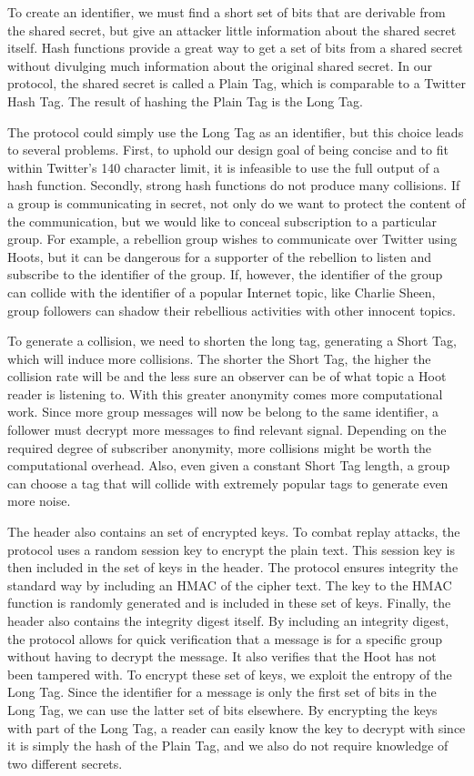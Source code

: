 \documentclass{acm_proc_article-sp}
\begin{document}
To create an identifier, we must find a short set of bits that are derivable from the shared secret, but give an attacker little information about the shared secret itself. Hash functions provide a great way to get a set of bits from a shared secret without divulging much information about the original shared secret. In our protocol, the shared secret is called a Plain Tag, which is comparable to a Twitter Hash Tag. The result of hashing the Plain Tag is the Long Tag. 

The protocol could simply use the Long Tag as an identifier, but this choice leads to several problems. First, to uphold our design goal of being concise and to fit within Twitter's 140 character limit, it is infeasible to use the full output of a hash function. Secondly, strong hash functions do not produce many collisions. If a group is communicating in secret, not only do we want to protect the content of the communication, but we would like to conceal subscription to a particular group. For example, a rebellion group wishes to communicate over Twitter using Hoots, but it can be dangerous for a supporter of the rebellion to listen and subscribe to the identifier of the group. If, however, the identifier of the group can collide with the identifier of a popular Internet topic, like Charlie Sheen, group followers can shadow their rebellious activities 
with other innocent topics. 

To generate a collision, we need to shorten the long tag, generating a Short Tag, which will induce more collisions. The shorter the Short Tag, the higher the collision rate will be and the less sure an observer can be of what topic a Hoot reader is listening to. With this greater anonymity comes more computational work. Since more group messages will now be belong to the same identifier, a follower must decrypt more messages to find relevant signal. Depending on the required degree of subscriber anonymity, more collisions might be worth the computational overhead. Also, even given a constant Short Tag length, a group can choose a tag that will collide with extremely popular tags to generate even more noise. 

The header also contains an set of encrypted keys. To combat replay attacks, the protocol uses a random session key to encrypt the plain text. This session key is then included in the set of keys in the header. The protocol ensures integrity the standard way by including an HMAC of the cipher text. The key to the HMAC function is randomly generated and is included in these set of keys. Finally, the header also contains the integrity digest itself. By including an integrity digest, the protocol allows for quick verification that a message is for a specific group without having to decrypt the message. It also verifies that the Hoot has not been tampered with. To encrypt these set of keys, we exploit the entropy of the Long Tag. Since the identifier for a message is only the first set of bits in the Long Tag, we can use the latter set of bits elsewhere. By encrypting the keys with part of the Long Tag, a reader can easily know the key to decrypt with since it is simply the hash of the Plain Tag, and we also do not require knowledge of two different secrets.
\end{document}
